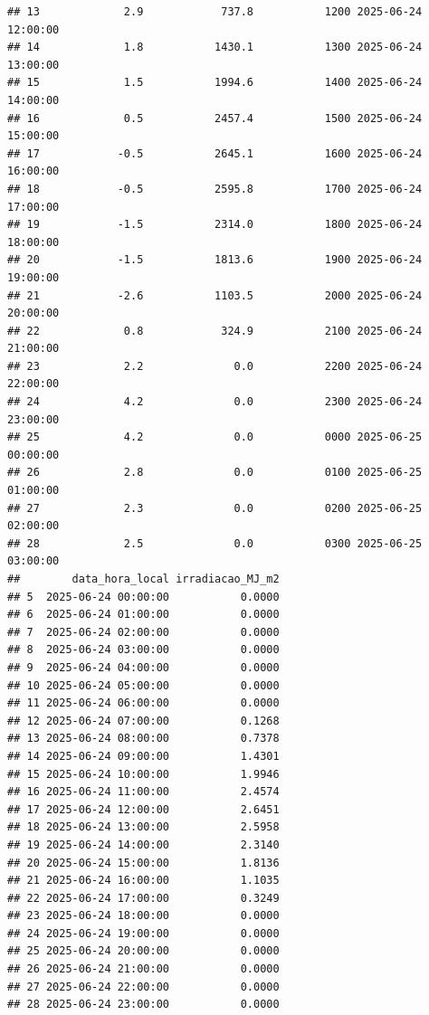 \documentclass[
]{article}
\begin{document}
\begin{verbatim}
## 13             2.9            737.8           1200 2025-06-24 12:00:00
## 14             1.8           1430.1           1300 2025-06-24 13:00:00
## 15             1.5           1994.6           1400 2025-06-24 14:00:00
## 16             0.5           2457.4           1500 2025-06-24 15:00:00
## 17            -0.5           2645.1           1600 2025-06-24 16:00:00
## 18            -0.5           2595.8           1700 2025-06-24 17:00:00
## 19            -1.5           2314.0           1800 2025-06-24 18:00:00
## 20            -1.5           1813.6           1900 2025-06-24 19:00:00
## 21            -2.6           1103.5           2000 2025-06-24 20:00:00
## 22             0.8            324.9           2100 2025-06-24 21:00:00
## 23             2.2              0.0           2200 2025-06-24 22:00:00
## 24             4.2              0.0           2300 2025-06-24 23:00:00
## 25             4.2              0.0           0000 2025-06-25 00:00:00
## 26             2.8              0.0           0100 2025-06-25 01:00:00
## 27             2.3              0.0           0200 2025-06-25 02:00:00
## 28             2.5              0.0           0300 2025-06-25 03:00:00
##        data_hora_local irradiacao_MJ_m2
## 5  2025-06-24 00:00:00           0.0000
## 6  2025-06-24 01:00:00           0.0000
## 7  2025-06-24 02:00:00           0.0000
## 8  2025-06-24 03:00:00           0.0000
## 9  2025-06-24 04:00:00           0.0000
## 10 2025-06-24 05:00:00           0.0000
## 11 2025-06-24 06:00:00           0.0000
## 12 2025-06-24 07:00:00           0.1268
## 13 2025-06-24 08:00:00           0.7378
## 14 2025-06-24 09:00:00           1.4301
## 15 2025-06-24 10:00:00           1.9946
## 16 2025-06-24 11:00:00           2.4574
## 17 2025-06-24 12:00:00           2.6451
## 18 2025-06-24 13:00:00           2.5958
## 19 2025-06-24 14:00:00           2.3140
## 20 2025-06-24 15:00:00           1.8136
## 21 2025-06-24 16:00:00           1.1035
## 22 2025-06-24 17:00:00           0.3249
## 23 2025-06-24 18:00:00           0.0000
## 24 2025-06-24 19:00:00           0.0000
## 25 2025-06-24 20:00:00           0.0000
## 26 2025-06-24 21:00:00           0.0000
## 27 2025-06-24 22:00:00           0.0000
## 28 2025-06-24 23:00:00           0.0000
\end{verbatim}
\end{document}

